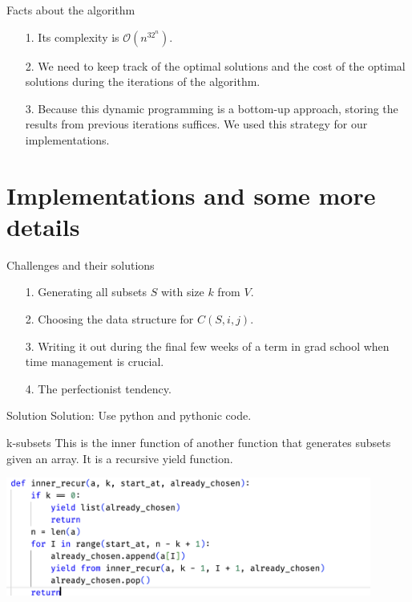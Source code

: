 \documentclass[11pt]{beamer}
\begin{document}
    \begin{frame}{Facts about the algorithm}
        \begin{itemize}
            \item [1.] Its complexity is $\mathcal{O}(n^32^n)$. 
            \item [2.] We need to keep track of the optimal solutions and the cost of the optimal solutions during the iterations of the algorithm. 
            \item [3.] Because this dynamic programming is a bottom-up approach, storing the results from previous iterations suffices. We used this strategy for our implementations. 
        \end{itemize}
    \end{frame}
\section{Implementations and some more details}
    \begin{frame}{Challenges and their solutions}
        \begin{itemize}
            \item [1.] Generating all subsets $S$ with size $k$ from $V$. 
            \item [2.] Choosing the data structure for $C(S, i, j)$. 
            \item [3.] Writing it out during the final few weeks of a term in grad school when time management is crucial.
            \item [4.] The perfectionist tendency. 
        \end{itemize}
        \pause
        \begin{block}{Solution}
            Solution: Use python and pythonic code. 
        \end{block}
    \end{frame}
    \begin{frame}{k-subsets}
        This is the inner function of another function that generates subsets given an array. It is a recursive yield function. 
        \begin{center}
            \includegraphics[width=12cm]{k_subsets.png}    
        \end{center}
    \end{frame}
\end{document}
